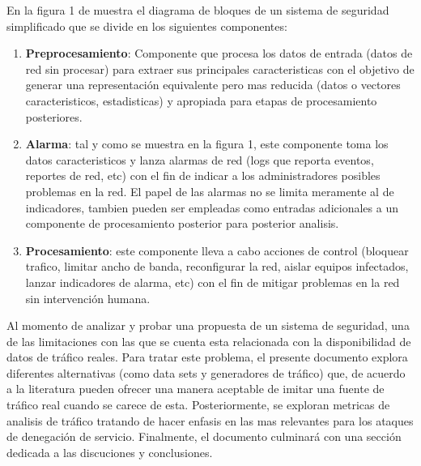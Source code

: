 \documentclass[12pt]{article}
\begin{document}
En la figura 1 de muestra el diagrama de bloques  de un sistema de seguridad simplificado que se divide en los siguientes componentes:
\begin{enumerate}
\item \textbf{Preprocesamiento}: Componente que procesa los datos de entrada (datos de red sin procesar) para extraer sus principales caracteristicas con el objetivo de generar una representación equivalente pero mas reducida (datos o vectores caracteristicos, estadisticas) y apropiada para etapas de procesamiento posteriores.
\item \textbf{Alarma}: tal y como se muestra en la figura 1, este componente toma los datos caracteristicos y lanza alarmas de red (logs que reporta eventos, reportes de red, etc) con el fin de indicar a los administradores posibles problemas en la red. El papel de las alarmas no se limita meramente al de indicadores, tambien pueden ser empleadas como entradas adicionales a un componente de procesamiento posterior para posterior analisis.
\item \textbf{Procesamiento}:  este componente lleva a cabo acciones de control (bloquear trafico, limitar ancho de banda, reconfigurar la red, aislar equipos infectados, lanzar indicadores de alarma, etc) con el fin de mitigar problemas en la red sin intervención humana.
\end{enumerate}

Al momento de analizar y probar una propuesta de un sistema de seguridad, una de las limitaciones con las que se cuenta esta relacionada con la disponibilidad de datos de tráfico reales. Para tratar este problema, el presente documento explora diferentes alternativas (como data sets y generadores de tráfico) que, de acuerdo a la literatura pueden ofrecer una manera aceptable de imitar una fuente de tráfico real cuando se carece de esta. Posteriormente, se exploran metricas de analisis de tráfico tratando de hacer enfasis en las mas relevantes para los ataques de denegación de servicio. Finalmente, el documento culminará con una sección dedicada a las discuciones y conclusiones.
\end{document}
